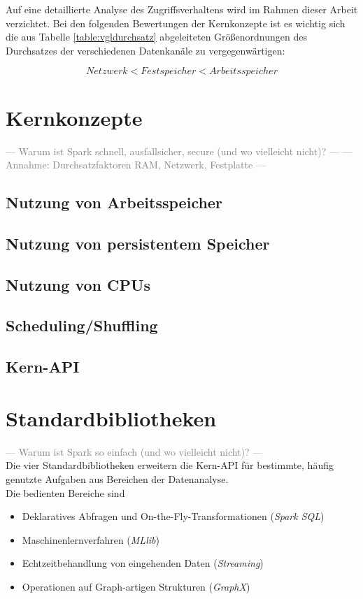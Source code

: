 Auf eine detaillierte Analyse des Zugriffsverhaltens wird im Rahmen dieser Arbeit verzichtet. Bei den folgenden Bewertungen der Kernkonzepte ist es wichtig sich die aus Tabelle \ref{table:vgldurchsatz} abgeleiteten Größenordnungen des Durchsatzes der verschiedenen Datenkanäle zu vergegenwärtigen:

\begin{equation*}
	Netzwerk < Festspeicher < Arbeitsspeicher
\end{equation*}

\section{Kernkonzepte}
\textcolor{gray}{--- Warum ist Spark schnell, ausfallsicher, secure (und wo vielleicht nicht)? ---}
\textcolor{gray}{--- Annahme: Durchsatzfaktoren RAM, Netzwerk, Festplatte ---}
\subsection{Nutzung von Arbeitsspeicher}
\subsection{Nutzung von persistentem Speicher}
\subsection{Nutzung von CPUs}
\subsection{Scheduling/Shuffling}
\subsection{Kern-API}

\section{Standardbibliotheken}
\textcolor{gray}{--- Warum ist Spark so einfach (und wo vielleicht nicht)? ---}\\
Die vier Standardbibliotheken erweitern die Kern-API für bestimmte, häufig genutzte Aufgaben aus Bereichen der Datenanalyse.\\

Die bedienten Bereiche sind
\begin{itemize}
	\item Deklaratives Abfragen und On-the-Fly-Transformationen (\textit{Spark SQL})
	\item Maschinenlernverfahren (\textit{MLlib})
	\item Echtzeitbehandlung von eingehenden Daten (\textit{Streaming})
	\item Operationen auf Graph-artigen Strukturen (\textit{GraphX})
\end{itemize}

